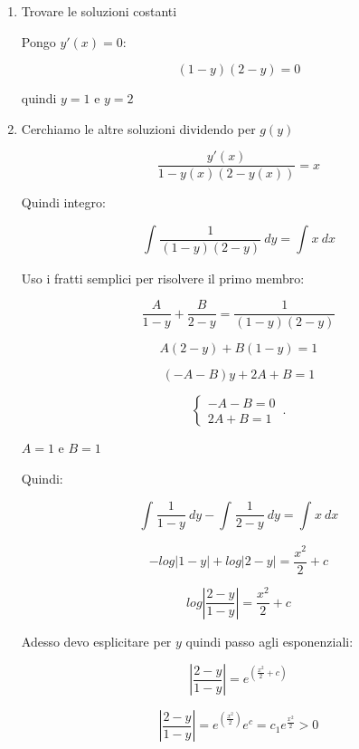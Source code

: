 \documentclass[11pt]{article}
\begin{document}
\begin{enumerate}
    \item Trovare le soluzioni costanti

        Pongo $y'(x) = 0 $:

        \[
            (1-y)(2-y) = 0
        \]

        quindi $y=1$ e $y=2$

    \item Cerchiamo le altre soluzioni dividendo per $g(y)$

        \[
            \frac{y'(x)}{1-y(x)(2-y(x))} = x
        \]

        Quindi integro:

        \[
            \int_{{}}^{{}} {\frac{1}{(1-y)(2-y)} } \: d{y} {}= \int_{{}}^{{}} {x} \: d{x} {}
        \]

        Uso i fratti semplici per risolvere il primo membro:

        \[
            \frac{A}{1-y} + \frac{B}{2-y} = \frac{1}{(1-y)(2-y)} 
        \]

        \[
            A(2-y)+B(1-y) = 1
        \]

        \[
            (-A -B) y +2A + B = 1
        \]

        \begin{equation}
            \begin{cases}
              -A -B = 0\\
              2A+B= 1
            \end{cases}\,.
        \end{equation}

        $A=1$ e $B=1$
        
        Quindi:

        \[
            \int_{{}}^{{}} {\frac{1}{1-y}} \: d{y} {}- \int_{{}}^{{}} {\frac{1}{2-y} } \: d{y} {} = \int_{{}}^{{}} {x} \: d{x} {}
        \]

        \[
            -log|1-y| + log|2-y| = \frac{x ^{2}}{2} +c
        \]

        \[
            log|\frac{2-y}{1-y} | = \frac{x ^{2}}{2} +c
        \]

        Adesso devo esplicitare per $y$ quindi passo agli esponenziali:

        \[
            |\frac{2-y}{1-y} | = e^{(\frac{x ^{2}}{2} +c)}
        \]

        \[
            |\frac{2-y}{1-y} | = e^{(\frac{x ^{2}}{2})} e ^{c} = c_1 e ^{\frac{x ^{2}}{2} } >0
        \]


\end{enumerate}
\end{document}
